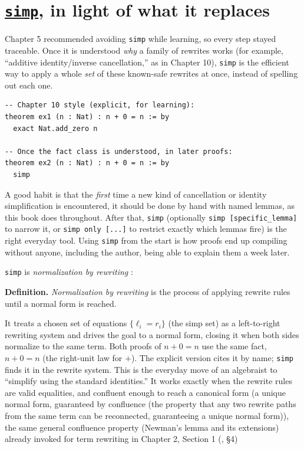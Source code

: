 \section{\texorpdfstring{\href{https://lean-lang.org/doc/reference/latest/Tactic-Proofs/Tactic-Reference/}{\texttt{simp}}, in light of what it replaces}{simp, in light of what it replaces}}\label{sec:13-working-efficiently:03-simp:1}

Chapter 5 recommended avoiding \texttt{simp} while learning, so every step stayed traceable. Once it is understood \emph{why} a family of rewrites works (for example, ``additive identity/inverse cancellation,'' as in Chapter 10), \texttt{simp} is the efficient way to apply a whole \emph{set} of these known-safe rewrites at once, instead of spelling out each one.

\begin{lstlisting}
-- Chapter 10 style (explicit, for learning):
theorem ex1 (n : Nat) : n + 0 = n := by
  exact Nat.add_zero n

-- Once the fact class is understood, in later proofs:
theorem ex2 (n : Nat) : n + 0 = n := by
  simp
\end{lstlisting}

A good habit is that the \emph{first} time a new kind of cancellation or identity simplification is encountered, it should be done by hand with named lemmas, as this book does throughout. After that, \texttt{simp} (optionally \texttt{simp [specific\_\allowbreak{}lemma]} to narrow it, or \texttt{simp only [...]} to restrict exactly which lemmas fire) is the right everyday tool. Using \texttt{simp} from the start is how proofs end up compiling without anyone, including the author, being able to explain them a week later.

\begin{mathreading}

\texttt{simp} is \emph{normalization by rewriting} \cite{Huet1980}:

\end{mathreading}

\textbf{Definition.} \emph{Normalization by rewriting} is the process of applying rewrite rules until a normal form is reached.

It treats a chosen set of equations \(\{\ell_i = r_i\}\) (the simp set) as a left-to-right rewriting system and drives the goal to a normal form, closing it when both sides normalize to the same term. Both proofs of \(n + 0 = n\) use the same fact, \(n + 0 = n\) (the right-unit law for \(+\)). The explicit version cites it by name; \texttt{simp} finds it in the rewrite system. This is the everyday move of an algebraist to ``simplify using the standard identities.'' It works exactly when the rewrite rules are valid equalities, and confluent enough to reach a canonical form (a unique normal form, guaranteed by confluence (the property that any two rewrite paths from the same term can be reconnected, guaranteeing a unique normal form)), the same general confluence property (Newman's lemma and its extensions) already invoked for term rewriting in Chapter 2, Section 1 (\cite{Huet1980}, §4)
